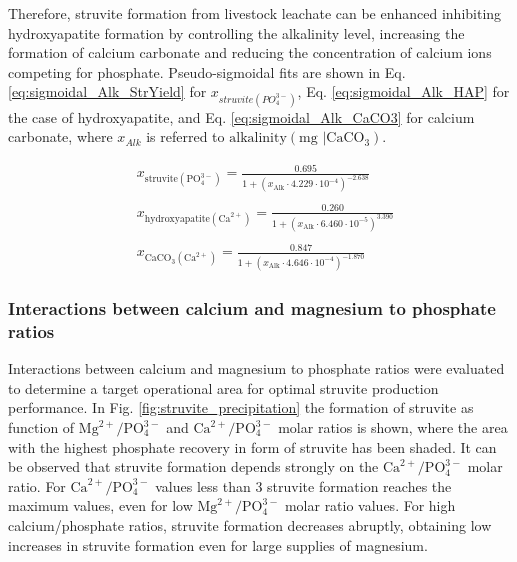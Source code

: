 \documentclass[10pt,a4paper]{article}
\begin{document}
Therefore, struvite formation from livestock leachate can be enhanced inhibiting hydroxyapatite formation by controlling the alkalinity level, increasing the formation of calcium carbonate and reducing the concentration of calcium ions competing for phosphate. 
Pseudo-sigmoidal fits are shown in Eq. \ref{eq:sigmoidal_Alk_StrYield} for $x_{struvite \left(PO_{4}^{3-}\right)}$, Eq. \ref{eq:sigmoidal_Alk_HAP} for the case of hydroxyapatite, and Eq. \ref{eq:sigmoidal_Alk_CaCO3} for calcium carbonate, where $ x_{Alk}$ is referred to $\text{alkalinity} \left( \text{mg } |\text{CaCO}_{3}\right)$.

\begin{align}
& x_{\text{struvite} \left(\text{PO}_{4}^{3-}\right)} = \frac{0.695}{1+\left(x_{\text{Alk}} \cdot 4.229 \cdot 10^{-4}\right)^{-2.638}} \label{eq:sigmoidal_Alk_StrYield} \\
\nonumber \\
& x_{\text{hydroxyapatite} \left(\text{Ca}^{2+}\right)} = \frac{0.260}{1+\left(x_{\text{Alk}} \cdot 6.460 \cdot 10^{-5}\right)^{3.390}} \label{eq:sigmoidal_Alk_HAP} \\
\nonumber \\
& x_{\text{CaCO}_{3} \left(\text{Ca}^{2+}\right)} = \frac{0.847}{1+\left(x_{\text{Alk}} \cdot 4.646 \cdot 10^{-4}\right)^{-1.870}} \label{eq:sigmoidal_Alk_CaCO3}
\end{align}

\subsubsection{Interactions between calcium and magnesium to phosphate ratios}
Interactions between calcium and magnesium to phosphate ratios were evaluated to determine a target operational area for optimal struvite production performance. In Fig. \ref{fig:struvite_precipitation} the formation of struvite as function of $\text{Mg}^{2+}/\text{PO}_{4}^{3-}$ and $\text{Ca}^{2+}/\text{PO}_{4}^{3-}$ molar ratios is shown, where the area with the highest phosphate recovery in form of struvite has been shaded. It can be observed that struvite formation depends strongly on the $\text{Ca}^{2+}/\text{PO}_{4}^{3-}$ molar ratio. For $\text{Ca}^{2+}/\text{PO}_{4}^{3-}$ values less than 3 struvite formation reaches the maximum values, even for low $\text{Mg}^{2+}/\text{PO}_{4}^{3-}$ molar ratio values. For high calcium/phosphate ratios, struvite formation decreases abruptly, obtaining low increases in struvite formation  even for large supplies of magnesium.
\end{document}
